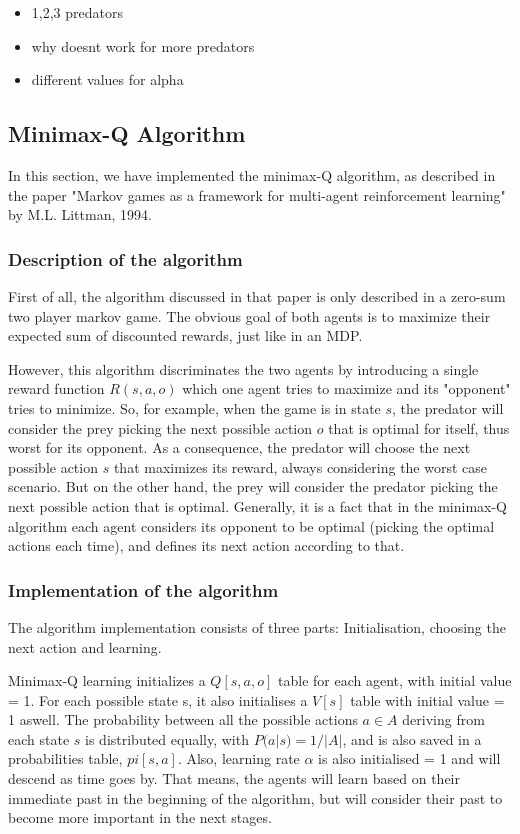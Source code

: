 \documentclass[a4paper,11pt]{article}
\begin{document}
\begin{itemize}
\item 1,2,3 predators
\item why doesnt work for more predators
\item different values for alpha
\end{itemize}


\subsection*{Minimax-Q Algorithm}

In this section, we have implemented the minimax-Q algorithm, as described in the paper "Markov games as a framework for multi-agent reinforcement learning" by M.L. Littman, 1994.

\subsubsection*{Description of the algorithm}

First of all, the algorithm discussed in that paper is only described in a zero-sum two player markov game. The obvious goal of both agents is to maximize their expected sum of discounted rewards, just like in an MDP.

However, this algorithm discriminates the two agents by introducing a single reward function $R(s,a,o)$ which one agent tries to maximize and its "opponent" tries to minimize. So, for example, when the game is in state $s$, the predator will consider the prey picking the next possible action $o$ that is optimal for itself, thus worst for its opponent. As a consequence, the predator will choose the next possible action $s$ that maximizes its reward, always considering the worst case scenario. But on the other hand, the prey will consider the predator picking the next possible action that is optimal. Generally, it is a fact that in the minimax-Q algorithm each agent considers its opponent to be optimal (picking the optimal actions each time), and defines its next action according to that.

\subsubsection*{Implementation of the algorithm}

The algorithm implementation consists of three parts: 	Initialisation, choosing the next action and learning. 

Minimax-Q learning initializes a $Q[s,a,o]$ table for each agent, with initial value = 1. For each possible state s, it also initialises a $V[s]$ table with initial value = 1 aswell. The probability between all the possible actions $a\in A$ deriving from each state $s$ is distributed equally, with $P(a|s) = 1/|A|$, and is also saved in a probabilities table, $pi[s,a]$. Also, learning rate $\alpha$ is also initialised = 1 and will descend as time goes by. That means, the agents will learn based on their immediate past in the beginning of the algorithm, but will consider their past to become more important in the next stages.
\end{document}
